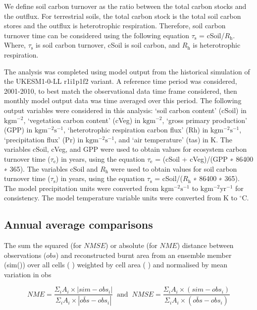 \documentclass[bg, manuscript]{copernicus}
\begin{document}
We define soil carbon turnover as the ratio between the total carbon stocks and the outflux. For terrestrial soils, the total carbon stock is the total soil carbon stores and the outflux is heterotrophic respiration. Therefore, soil carbon turnover time can be considered using the following equation $\tau_\mathrm{s}$ = cSoil/$R_\mathrm{h}$. Where, $\tau_\mathrm{s}$ is soil carbon turnover, cSoil is soil carbon, and $R_\mathrm{h}$ is heterotrophic respiration.

The analysis was completed using model output from the historical simulation of the UKESM1-0-LL r1i1p1f2 variant. A reference time period was considered, 2001-2010, to best match the observational data time frame considered, then monthly model output data was time averaged over this period. The following output variables were considered in this analysis: ‘soil carbon content’ (cSoil) in $\mathrm{kg} \mathrm{m}^{−2}$, ‘vegetation carbon content’ (cVeg) in $\mathrm{kg} \mathrm{m}^{−2}$, ‘gross primary production’ (GPP) in $\mathrm{kg} \mathrm{m}^{−2} \mathrm{s}^{−1}$,  ‘heterotrophic respiration carbon flux’ (Rh) in $\mathrm{kg} \mathrm{m}^{−2} \mathrm{s}^{−1}$, ‘precipitation flux’ (Pr) in $\mathrm{kg} \mathrm{m}^{−2} \mathrm{s}^{−1}$, and ‘air temperature’ (tas) in K.
The variables cSoil, cVeg, and GPP were used to obtain values for ecosystem carbon turnover time ($\tau_\mathrm{e}$) in years, using the equation $\tau_\mathrm{e}$ = (cSoil + cVeg)/(GPP ∗ 86400 ∗ 365). The variables cSoil and $R_\mathrm{h}$ were used to obtain values for soil carbon turnover time ($\tau_\mathrm{s}$) in years, using the equation $\tau_\mathrm{s}$ = cSoil/($R_\mathrm{h}$ ∗ 86400 ∗ 365). The model precipitation units were converted from $\mathrm{kg} \mathrm{m}^{−2} \mathrm{s}^{−1}$ to $\mathrm{kg} \mathrm{m}^{−2} \mathrm{yr}^{−1}$ for consistency. The model temperature variable units were converted from K to $^\circ$C. 

\subsection{Annual average comparisons}
The sum the squared (for $NMSE$) or absolute (for $NME$) distance between observations ($obs$) and reconstructed burnt area from an ensemble member (sim()) over all cells  ( ) weighted by cell area ( ) and normalised by mean variation in obs

\begin{equation}
    NME = \frac{\Sigma_i A_i \times  |sim - obs_i |}{\Sigma_i A_i \times |\bar{obs} - obs_i |} \  \text{   and   } \
    NMSE = \frac{\Sigma_i A_i \times  (sim- obs_i) }{\Sigma_i A_i \times (\bar{obs} - obs_i )}
\end{equation}
\end{document}
